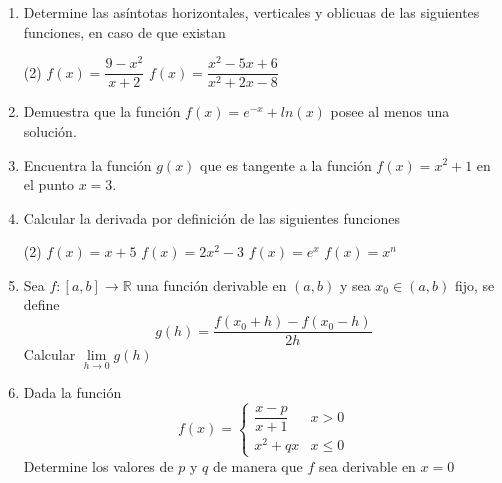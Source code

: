 \documentclass[12pt]{article}
\newenvironment{preguntas}
{\begin{enumerate}\itemsep12pt
	}
	{
	\end{enumerate}
}
\newcommand{\ra}{\rightarrow}
\newcommand{\R}{\mathbb{R}}
\begin{document}
\begin{preguntas}
\item Determine las asíntotas horizontales, verticales y oblicuas de las siguientes funciones, en caso de que existan
\begin{tasks}(2)
\task $f(x) = \dfrac{9-x^2}{x+2}$
\task $f(x) = \dfrac{x^2-5x+6}{x^2+2x-8}$
\end{tasks}
\item Demuestra que la función $f(x) = e^{-x} + ln(x)$ posee al menos una solución.
\item Encuentra la función $g(x)$ que es tangente a la función $f(x) = x^2 + 1$ en el punto $x = 3$.
\item Calcular la derivada por definición de las siguientes funciones
\begin{tasks}(2)
\task $f(x) = x+5$
\task $f(x) = 2x^2-3$
\task $f(x) = e^x$
\task $f(x) = x^n$
\end{tasks}
\item Sea $f:[a,b] \ra \R$ una función derivable en $(a,b)$ y sea $x_0 \in (a,b)$ fijo, se define
$$ g(h) = \dfrac{f(x_0 + h) - f(x_0-h)}{2h}$$
Calcular $\lim\limits_{h \ra 0} g(h)$
\item Dada la función
$$f(x) = \begin{cases}
\dfrac{x-p}{x+1} & x > 0\\
x^2+qx & x \leq 0
\end{cases}$$
Determine los valores de $p$ y $q$ de manera que $f$ sea derivable en $x=0$
\end{preguntas}
\end{document}
